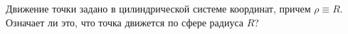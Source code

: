 Движение точки задано в цилиндрической системе координат, причем
$\rho\equiv R$. Означает ли это, что точка движется по сфере радиуса
$R$? 
